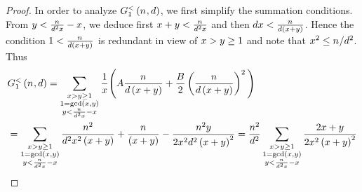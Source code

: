 \begin{proof}
    In order to analyze
    $\BulkQuantityOf{\Size,\TheDivisor}$, we first simplify the summation
    conditions.  From $y < \frac{n_{}}{d^2x} -
    x$, we deduce first $x+y <
    \frac{n_{}}{d^2x}$ and then
    $\TheDivisor\LeftA<\frac{\Size}{\TheDivisor\Parens{\LeftA+\RightA}}$. Hence  the condition $1 <
    \frac{\Size}{\TheDivisor\Parens{\LeftA+\RightA}}$ is redundant in view
    of $x>y\geq 1$ and note that $x^2 \leq
    n_{}/d^2$. Thus
    \begin{align*}
    &  \BulkQuantityOf{\Size,\TheDivisor}
       =
        \Sum[\substack{
        \LeftA>\RightA\geq 1 \\
      1 = \gcdOf{\LeftA,\RightA} \\
      \RightA < \frac{\Size}{\TheDivisor^2\LeftA} - \LeftA
        }]{
      \frac{1}{\LeftA}
      \Parens[\Bigg]{
        \ConstantTerm\frac{\Size}{\TheDivisor\Parens{\LeftA+\RightA}}
      +\frac{\LinearTerm}{2}\Parens{\frac{\Size}{\TheDivisor\Parens{\LeftA+\RightA}}}^2
      }
      }
      \\
      & =
        \Sum[\substack{
        \LeftA>\RightA\geq 1 \\
      1 = \gcdOf{\LeftA,\RightA} \\
      \RightA < \frac{\Size}{\TheDivisor^2\LeftA} - \LeftA
        }]{
      \frac{\Size^2}{\TheDivisor^2\LeftA^2\Parens{\LeftA+\RightA}}
      +
      \frac{\Size}{\Parens{\LeftA+\RightA}}
      -\frac{\Size^2\RightA}{2\LeftA^2\TheDivisor^2\Parens{\LeftA+\RightA}^2}
      }
        =
        \frac{\Size^2}{\TheDivisor^2}
        \Sum[\substack{
        \LeftA>\RightA\geq 1 \\
      1 = \gcdOf{\LeftA,\RightA} \\
      \RightA < \frac{\Size}{\TheDivisor^2\LeftA} - \LeftA
        }]{
      \frac{2\LeftA+\RightA}{2\LeftA^2\Parens{\LeftA+\RightA}^2}
}
\end{align*}
\end{proof}
